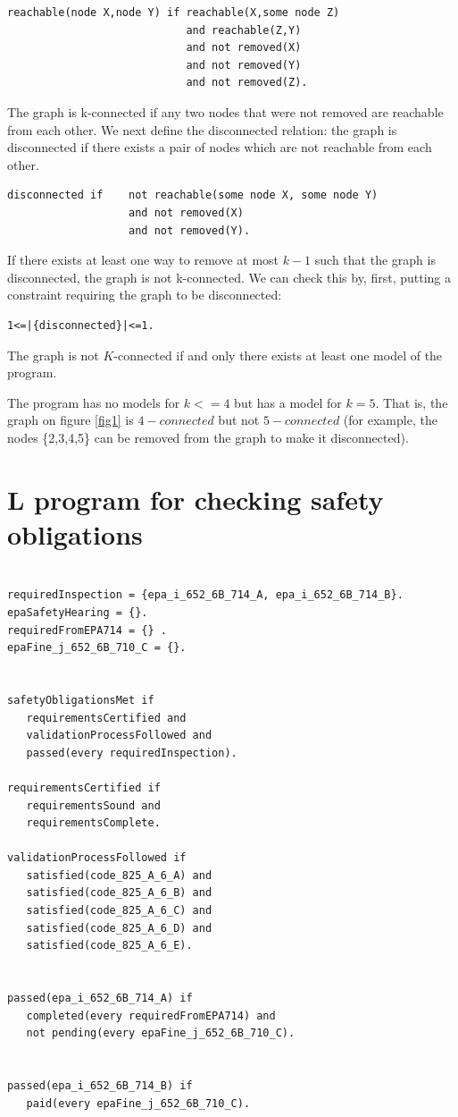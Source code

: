 \documentclass[a4paper,10pt]{article}
\begin{document}
\begin{verbatim}
reachable(node X,node Y) if reachable(X,some node Z)
                            and reachable(Z,Y) 
                            and not removed(X) 
                            and not removed(Y) 
                            and not removed(Z).
\end{verbatim}


\medskip\noindent
The graph is k-connected if any two nodes  that were not removed are reachable from each other.
We next define the disconnected relation: the graph is disconnected if there exists a pair of nodes which are not reachable from
each other.

\begin{verbatim}
disconnected if    not reachable(some node X, some node Y) 
                   and not removed(X)
                   and not removed(Y).                
\end{verbatim}
If there exists at least one way to remove at most $k-1$ such that the graph is disconnected, the graph is not k-connected.
We can check this by, first, putting a constraint requiring the graph to be disconnected:

\begin{verbatim}
1<=|{disconnected}|<=1.
\end{verbatim}

\medskip\noindent
The graph is not $K$-connected if and only there exists at least one model of the program.

\medskip\noindent
The program has no models for $k<=4$ but has a model for $k=5$. That is, the graph on figure \ref{fig1} is $4-connected$ but not $5-connected$ (for example, the nodes \{2,3,4,5\} can be removed from the graph to make it disconnected).



 

\pagebreak
\appendix
\section{L program for checking safety obligations}\label{A}

\begin{verbatim}

requiredInspection = {epa_i_652_6B_714_A, epa_i_652_6B_714_B}.
epaSafetyHearing = {}.
requiredFromEPA714 = {} .
epaFine_j_652_6B_710_C = {}.


safetyObligationsMet if
   requirementsCertified and
   validationProcessFollowed and
   passed(every requiredInspection).

requirementsCertified if
   requirementsSound and
   requirementsComplete.

validationProcessFollowed if
   satisfied(code_825_A_6_A) and
   satisfied(code_825_A_6_B) and
   satisfied(code_825_A_6_C) and
   satisfied(code_825_A_6_D) and
   satisfied(code_825_A_6_E).


passed(epa_i_652_6B_714_A) if
   completed(every requiredFromEPA714) and
   not pending(every epaFine_j_652_6B_710_C).


passed(epa_i_652_6B_714_B) if
   paid(every epaFine_j_652_6B_710_C).

\end{verbatim}
\pagebreak
\end{document}
